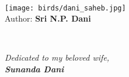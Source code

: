 \documentclass[11pt,openany]{book}
\begin{document}
\frontmatter





\newpage





\tableofcontents
\eject
~
\vfill

\thispagestyle{empty}

\begin{center}
\texttt{[image: birds/dani\_saheb.jpg]}\\[2pt]
{\large Author: \bf Sri N.P. Dani}
\end{center}
\vfill
\eject

~
\vfill
\thispagestyle{empty}
\begin{center}
{\sl\large Dedicated to my beloved wife,\\ {\large\bfseries Sunanda Dani}}
\end{center}
\vfill
\vfill
\eject




\mainmatter


\end{document}
